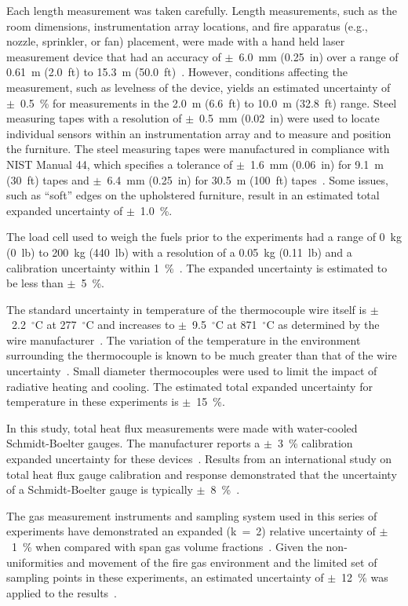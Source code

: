 \documentclass[12pt,oneside]{book}
\begin{document}
Each length measurement was taken carefully. Length measurements, such as the room dimensions, instrumentation array locations, and fire apparatus (e.g., nozzle, sprinkler, or fan) placement, were made with a hand held laser measurement device that had an accuracy of $\pm$~6.0~mm (0.25~in) over a range of 0.61~m (2.0~ft) to 15.3~m (50.0~ft)~\cite{StanleyTools}. However, conditions affecting the measurement, such as levelness of the device, yields an estimated uncertainty of $\pm$~0.5~\% for measurements in the 2.0~m (6.6~ft) to 10.0~m (32.8~ft) range.  Steel measuring tapes with a resolution of  $\pm$~0.5~mm (0.02~in) were used to locate individual sensors within an instrumentation array and to measure and position the furniture. The steel measuring tapes were manufactured in compliance with NIST Manual 44, which specifies a tolerance of $\pm$~1.6~mm (0.06~in) for 9.1~m (30~ft) tapes and $\pm$~6.4~mm (0.25~in) for 30.5~m (100~ft) tapes~\cite{Butcher:2012}. Some issues, such as ``soft'' edges on the upholstered furniture, result in an estimated total expanded uncertainty of $\pm$~1.0~\%.

The load cell used to weigh the fuels prior to the experiments had a range of 0~kg (0~lb) to 200~kg (440~lb) with a resolution of a 0.05~kg (0.11~lb) and a calibration uncertainty within 1~\%~\cite{Ohaus:2000}. The expanded uncertainty is estimated to be less than $\pm$~5~\%.

The standard uncertainty in temperature of the thermocouple wire itself is $\pm$~2.2~$^{\circ}$C at 277~$^{\circ}$C and increases to $\pm$~9.5~$^{\circ}$C at 871~$^{\circ}$C as determined by the wire manufacturer~\cite{Omega:2004}. The variation of the temperature in the environment surrounding the thermocouple is known to be much greater than that of the wire uncertainty~\cite{Blevins:1999,Pitts:2003}. Small diameter thermocouples were used to limit the impact of radiative heating and cooling. The estimated total expanded uncertainty for temperature in these experiments is $\pm$~15~\%.

In this study, total heat flux measurements were made with water-cooled Schmidt-Boelter gauges. The manufacturer reports a $\pm$~3~\% calibration expanded uncertainty for these devices~\cite{Medtherm:2003}. Results from an international study on total heat flux gauge calibration and response demonstrated that the uncertainty of a Schmidt-Boelter gauge is typically $\pm$~8~\%~\cite{Pitts:2006}.

The gas measurement instruments and sampling system used in this series of experiments have demonstrated an expanded (k~=~2) relative uncertainty of $\pm$~1~\% when compared with span gas volume fractions~\cite{Bundy:2007}. Given the non-uniformities and movement of the fire gas environment and the limited set of sampling points in these experiments, an estimated uncertainty of $\pm$~12~\% was applied to the results~\cite{Lock:1}.
\end{document}

